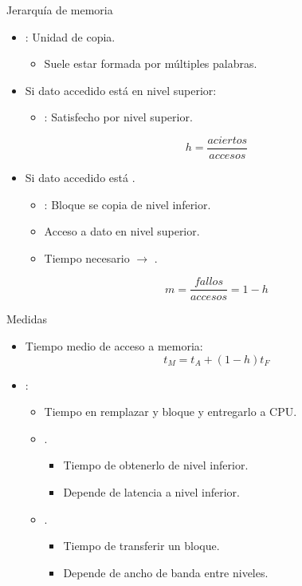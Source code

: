 \begin{frame}[t]{Jerarquía de memoria}
\begin{itemize}
  \item {}: Unidad de copia.
    \begin{itemize}
      \item Suele estar formada por múltiples palabras.
    \end{itemize}

  \item Si dato accedido está  en nivel superior:
    \begin{itemize}
      \item {}: Satisfecho por nivel superior.
    \end{itemize}
\[
h = \frac{aciertos}{accesos}
\]

  \item Si dato accedido está .
    \begin{itemize}
      \item {}: Bloque se copia de nivel inferior.
      \item Acceso a dato en nivel superior.
      \item Tiempo necesario $\rightarrow$ .
    \end{itemize}
\[
m = \frac{fallos}{accesos} = 1 - h
\]

\end{itemize}
\end{frame}

\begin{frame}[t]{Medidas}
\begin{itemize}
  \item Tiempo medio de acceso a memoria:
\[
t_M = t_A + (1-h) t_F
\]
  \item {}:
    \begin{itemize}
      \item Tiempo en remplazar y bloque y entregarlo a CPU.
      \item {}.
        \begin{itemize}
          \item Tiempo de obtenerlo de nivel inferior.
          \item Depende de latencia a nivel inferior.
        \end{itemize}
      \item {}.
        \begin{itemize}
          \item Tiempo de transferir un bloque.
          \item Depende de ancho de banda entre niveles.
        \end{itemize}
    \end{itemize}
\end{itemize}
\end{frame}

